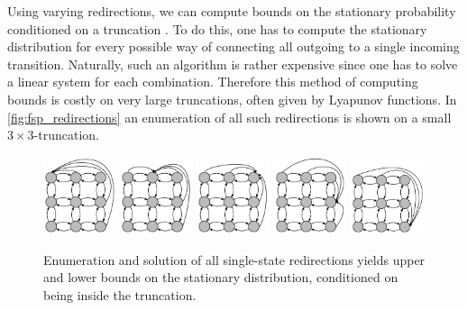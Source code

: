 Using varying redirections, we can compute bounds on the stationary probability conditioned on a truncation \parencite[Thm.~14]{spieler2014numerical}.
To do this, one has to compute the stationary distribution for every possible way of connecting all outgoing to a single incoming transition.
Naturally, such an algorithm is rather expensive since one has to solve a linear system for each combination.
Therefore this method of computing bounds is costly on very large truncations, often given by Lyapunov functions.
In \autoref{fig:fsp_redirections} an enumeration of all such redirections is shown on a small $3\times 3$-truncation.
\begin{figure}[htb]
    \centering
    \includegraphics[width=0.19\textwidth]{gfx/state_space_redirected_1.pdf}
    \includegraphics[width=0.19\textwidth]{gfx/state_space_redirected_2.pdf}
    \includegraphics[width=0.19\textwidth]{gfx/state_space_redirected_3.pdf}
    \includegraphics[width=0.19\textwidth]{gfx/state_space_redirected_4.pdf}
    \includegraphics[width=0.19\textwidth]{gfx/state_space_redirected_5.pdf}
    \caption[Redirections for bounds]{Enumeration and solution of all single-state
    redirections yields upper and lower bounds on the stationary
    distribution, conditioned on being inside the truncation.\label{fig:fsp_redirections}}
\end{figure}

